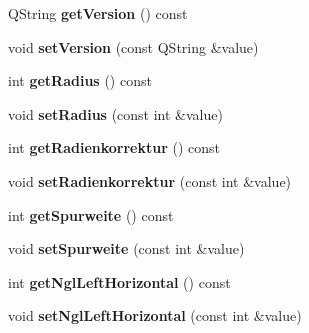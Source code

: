 \begin{DoxyCompactItemize}
\item 
\hypertarget{classDatapackage_a2668dc4c59aa862dc2d8ceed0491950e}{Q\-String {\bfseries get\-Version} () const }\label{classDatapackage_a2668dc4c59aa862dc2d8ceed0491950e}

\item 
\hypertarget{classDatapackage_abb4b106237a40d77a88f08c4b100430d}{void {\bfseries set\-Version} (const Q\-String \&value)}\label{classDatapackage_abb4b106237a40d77a88f08c4b100430d}

\item 
\hypertarget{classDatapackage_a2ddb140dae8c664c5427a79e28235619}{int {\bfseries get\-Radius} () const }\label{classDatapackage_a2ddb140dae8c664c5427a79e28235619}

\item 
\hypertarget{classDatapackage_aebfb1f2a09ca9d0628fb68e5dce20256}{void {\bfseries set\-Radius} (const int \&value)}\label{classDatapackage_aebfb1f2a09ca9d0628fb68e5dce20256}

\item 
\hypertarget{classDatapackage_a367c1575e48ab1b9d9e8c6f390574b0a}{int {\bfseries get\-Radienkorrektur} () const }\label{classDatapackage_a367c1575e48ab1b9d9e8c6f390574b0a}

\item 
\hypertarget{classDatapackage_a97de6e1959e391c6adf93404c0acf9c4}{void {\bfseries set\-Radienkorrektur} (const int \&value)}\label{classDatapackage_a97de6e1959e391c6adf93404c0acf9c4}

\item 
\hypertarget{classDatapackage_aec66f542acb81cc764d1610eb9114d6e}{int {\bfseries get\-Spurweite} () const }\label{classDatapackage_aec66f542acb81cc764d1610eb9114d6e}

\item 
\hypertarget{classDatapackage_a13ca1962c331a68e2d17f0b6ab4c463d}{void {\bfseries set\-Spurweite} (const int \&value)}\label{classDatapackage_a13ca1962c331a68e2d17f0b6ab4c463d}

\item 
\hypertarget{classDatapackage_a9f1178b918e1f5ba0dc05ab63ce8bbf7}{int {\bfseries get\-Ngl\-Left\-Horizontal} () const }\label{classDatapackage_a9f1178b918e1f5ba0dc05ab63ce8bbf7}

\item 
\hypertarget{classDatapackage_a9f5cfd9d6b90af25d5578094f1500dac}{void {\bfseries set\-Ngl\-Left\-Horizontal} (const int \&value)}\label{classDatapackage_a9f5cfd9d6b90af25d5578094f1500dac}


\end{DoxyCompactItemize}
